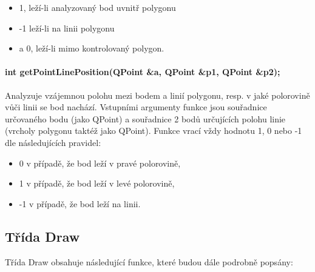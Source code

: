 \documentclass[11pt]{article}
\begin{document}
\begin{itemize}
	\item 1, leží-li analyzovaný bod uvnitř polygonu
	\item -1 leží-li na linii polygonu 
	\item a 0, leží-li mimo kontrolovaný polygon.
\end{itemize}

\paragraph{int getPointLinePosition(QPoint \&a, QPoint \&p1, QPoint \&p2);}
Analyzuje vzájemnou polohu mezi bodem a linií polygonu, resp. v jaké polorovině vůči linii se bod nachází. Vstupními argumenty funkce jsou souřadnice určovaného bodu (jako QPoint) a souřadnice 2 bodů určujících polohu linie (vrcholy polygonu taktéž jako QPoint). Funkce vrací vždy hodnotu 1, 0 nebo -1 dle následujících pravidel:

\begin{itemize}
	\item 0 v případě, že bod leží v pravé polorovině,
	\item 1 v případě, že  bod leží v levé polorovině,
	\item -1 v případě, že bod leží na linii.
\end{itemize}

\subsection{Třída Draw}
Třída Draw obsahuje následující funkce, které budou dále podrobně popsány:
\end{document}
